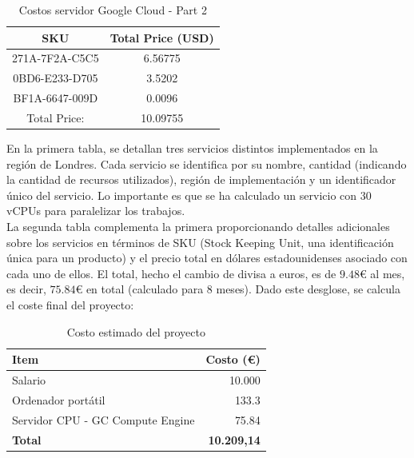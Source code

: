\begin{table}[htp]
      \centering
      \begin{tabular}{|c|c|}
            \hline
            \textbf{SKU}   & \textbf{Total Price (USD)} \\
            \hline
            271A-7F2A-C5C5 & 6.56775                    \\
            0BD6-E233-D705 & 3.5202                     \\
            BF1A-6647-009D & 0.0096                     \\
            \hline
            Total Price:   & 10.09755                   \\
            \hline
      \end{tabular}
      \caption{Costos servidor Google Cloud - Part 2}
      \label{tab:server_costs_part2}
\end{table}
En la primera tabla, se detallan tres servicios distintos implementados en la región de Londres. Cada servicio se identifica por su nombre, cantidad (indicando la cantidad de recursos utilizados), región de implementación y un identificador único del servicio. Lo importante es que se ha calculado un servicio con $30$ vCPUs para paralelizar los trabajos.\\[6pt]

La segunda tabla complementa la primera proporcionando detalles adicionales sobre los servicios en términos de SKU (Stock Keeping Unit, una identificación única para un producto) y el precio total en dólares estadounidenses asociado con cada uno de ellos. El total, hecho el cambio de divisa a euros, es de $9.48$€ al mes, es decir, $75.84$€ en total (calculado para 8 meses).
Dado este desglose, se calcula el coste final del proyecto:
\begin{table}[htp]
      \centering
      \begin{tabular}{|l|r|}
            \hline
            \textbf{Item}                    & \textbf{Costo (€)} \\ \hline
            Salario                          & 10.000             \\
            Ordenador portátil               & 133.3              \\
            Servidor CPU - GC Compute Engine & 75.84              \\
            \textbf{Total}                   & \textbf{10.209,14} \\ \hline
      \end{tabular}
      \caption{Costo estimado del proyecto}
      \label{tab:proyect_budget}
\end{table}